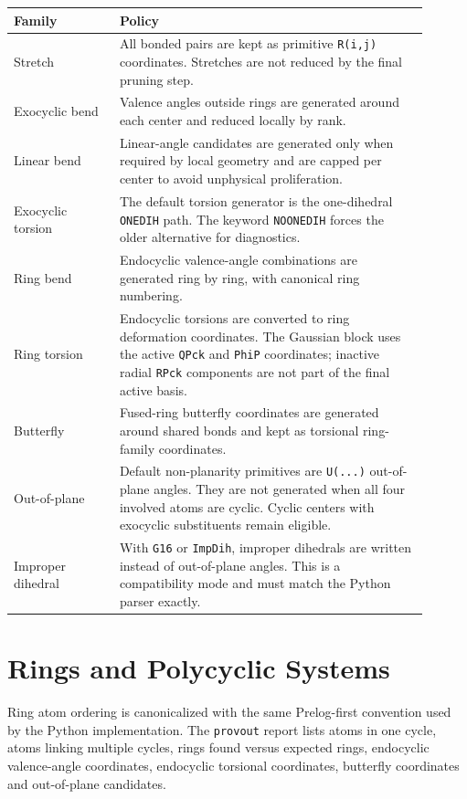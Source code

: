 \documentclass[11pt]{article}
\newcommand{\provout}{\texttt{provout}}
\begin{document}
\begin{longtable}{@{}p{0.23\linewidth}p{0.67\linewidth}@{}}
\toprule
Family & Policy \\
\midrule
\endhead
Stretch & All bonded pairs are kept as primitive \texttt{R(i,j)} coordinates.
Stretches are not reduced by the final pruning step. \\
Exocyclic bend & Valence angles outside rings are generated around each center
and reduced locally by rank. \\
Linear bend & Linear-angle candidates are generated only when required by local
geometry and are capped per center to avoid unphysical proliferation. \\
Exocyclic torsion & The default torsion generator is the one-dihedral
\texttt{ONEDIH} path.  The keyword \texttt{NOONEDIH} forces the older
alternative for diagnostics. \\
Ring bend & Endocyclic valence-angle combinations are generated ring by ring,
with canonical ring numbering. \\
Ring torsion & Endocyclic torsions are converted to ring deformation
coordinates.  The Gaussian block uses the active \texttt{QPck} and
\texttt{PhiP} coordinates; inactive radial \texttt{RPck} components are not
part of the final active basis. \\
Butterfly & Fused-ring butterfly coordinates are generated around shared bonds
and kept as torsional ring-family coordinates. \\
Out-of-plane & Default non-planarity primitives are \texttt{U(...)} out-of-plane
angles.  They are not generated when all four involved atoms are cyclic.  Cyclic
centers with exocyclic substituents remain eligible. \\
Improper dihedral & With \texttt{G16} or \texttt{ImpDih}, improper dihedrals are
written instead of out-of-plane angles.  This is a compatibility mode and must
match the Python parser exactly. \\
\bottomrule
\end{longtable}

\section{Rings and Polycyclic Systems}

Ring atom ordering is canonicalized with the same Prelog-first convention used
by the Python implementation.  The \provout{} report lists atoms in one cycle,
atoms linking multiple cycles, rings found versus expected rings, endocyclic
valence-angle coordinates, endocyclic torsional coordinates, butterfly
coordinates and out-of-plane candidates.
\end{document}
